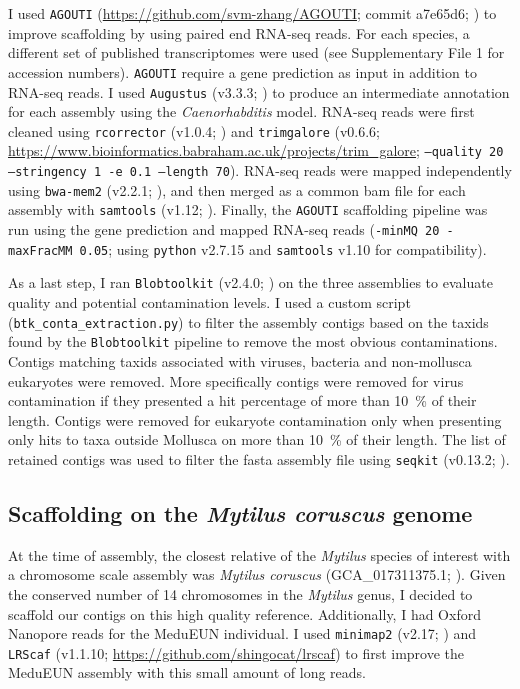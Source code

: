 \documentclass[11pt, a4paper]{article}
\begin{document}
I used \texttt{AGOUTI} (\url{https://github.com/svm-zhang/AGOUTI}; commit a7e65d6; \cite{Zhang2016a}) to improve scaffolding by using paired end RNA-seq reads.
For each species, a different set of published transcriptomes were used (see Supplementary File 1 for accession numbers).
\texttt{AGOUTI} require a gene prediction as input in addition to RNA-seq reads.
I used \texttt{Augustus} (v3.3.3; \cite{Stanke2008}) to produce an intermediate annotation for each assembly using the \textit{Caenorhabditis} model.
RNA-seq reads were first cleaned using \texttt{rcorrector} (v1.0.4; \cite{Song2015}) and \texttt{trimgalore} (v0.6.6; \url{https://www.bioinformatics.babraham.ac.uk/projects/trim_galore}; \texttt{--quality 20 \\--stringency 1 -e 0.1 --length 70}).
RNA-seq reads were mapped independently using \texttt{bwa-mem2} (v2.2.1; \cite{VasimuddinMd2019}), and then merged as a common bam file for each assembly with \texttt{samtools} (v1.12; \cite{Li2009}).
Finally, the \texttt{AGOUTI} scaffolding pipeline was run using the gene prediction and mapped RNA-seq reads (\texttt{-minMQ 20 -maxFracMM 0.05}; using \texttt{python} v2.7.15 and \texttt{samtools} v1.10 for compatibility).

As a last step, I ran \texttt{Blobtoolkit} (v2.4.0; \cite{Challis2020}) on the three assemblies to evaluate quality and potential contamination levels.
I used a custom script (\texttt{btk\_conta\_extraction.py}) to filter the assembly contigs based on the taxids found by the \texttt{Blobtoolkit} pipeline to remove the most obvious contaminations.
Contigs matching taxids associated with viruses, bacteria and non-mollusca eukaryotes were removed.
More specifically contigs were removed for virus contamination if they presented a hit percentage of more than 10~\% of their length.
Contigs were removed for eukaryote contamination only when presenting only hits to taxa outside Mollusca on more than 10~\% of their length.
The list of retained contigs was used to filter the fasta assembly file using \texttt{seqkit} (v0.13.2; \cite{Shen2016}).


\subsection{Scaffolding on the \textit{Mytilus coruscus} genome}

At the time of assembly, the closest relative of the \textit{Mytilus} species of interest with a chromosome scale assembly was \textit{Mytilus coruscus} (GCA\_017311375.1; \cite{Yang2021}).
Given the conserved number of 14 chromosomes in the \textit{Mytilus} genus, I decided to scaffold our contigs on this high quality reference.
Additionally, I had Oxford Nanopore reads for the MeduEUN individual. 
I used \texttt{minimap2} (v2.17; \cite{Li2017}) and \texttt{LRScaf} (v1.1.10; \url{https://github.com/shingocat/lrscaf}) to first improve the MeduEUN assembly with this small amount of long reads.
\end{document}
